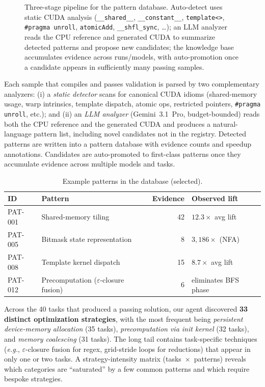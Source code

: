 \documentclass{article}
\begin{document}
\begin{figure}[ht]
\centering
\caption{Three-stage pipeline for the pattern database. Auto-detect uses static CUDA analysis (\texttt{\_\_shared\_\_}, \texttt{\_\_constant\_\_}, \texttt{template<>}, \texttt{\#pragma unroll}, \texttt{atomicAdd}, \texttt{\_\_shfl\_sync}, \ldots); an LLM analyzer reads the CPU reference and generated CUDA to summarize detected patterns and propose new candidates; the knowledge base accumulates evidence across runs/models, with auto-promotion once a candidate appears in sufficiently many passing samples.}
\label{fig:patdb}
\end{figure}

Each sample that compiles and passes validation is parsed by two complementary analyzers:
(i) a \emph{static detector} scans for canonical CUDA idioms (shared-memory usage, warp intrinsics, template dispatch, atomic ops, restricted pointers, \texttt{\#pragma unroll}, etc.); and
(ii) an \emph{LLM analyzer} (Gemini~3.1~Pro, budget-bounded) reads both the CPU reference and the generated CUDA and produces a natural-language pattern list, including novel candidates not in the registry.
Detected patterns are written into a pattern database with evidence counts and speedup annotations. Candidates are auto-promoted to first-class patterns once they accumulate evidence across multiple models and tasks.

\begin{table}[ht]
\centering
\small
\caption{Example patterns in the database (selected).}
\label{tab:patterns}
\begin{tabular}{@{}llrl@{}}
\toprule
\textbf{ID} & \textbf{Pattern} & \textbf{Evidence} & \textbf{Observed lift} \\
\midrule
PAT-001 & Shared-memory tiling                & 42 & $12.3\times$ avg lift \\
PAT-005 & Bitmask state representation        & 8  & $3{,}186\times$ (NFA) \\
PAT-008 & Template kernel dispatch            & 15 & $8.7\times$ avg lift \\
PAT-012 & Precomputation ($\varepsilon$-closure fusion) & 6  & eliminates BFS phase \\
\bottomrule
\end{tabular}
\end{table}

Across the 40 tasks that produced a passing solution, our agent discovered \textbf{33 distinct optimization strategies}, with the most frequent being \emph{persistent device-memory allocation} (35 tasks), \emph{precomputation via init kernel} (32 tasks), and \emph{memory coalescing} (31 tasks). The long tail contains task-specific techniques (\emph{e.g.}, $\varepsilon$-closure fusion for regex, grid-stride loops for reductions) that appear in only one or two tasks. A strategy-intensity matrix (tasks~$\times$~patterns) reveals which categories are ``saturated'' by a few common patterns and which require bespoke strategies.
\end{document}
